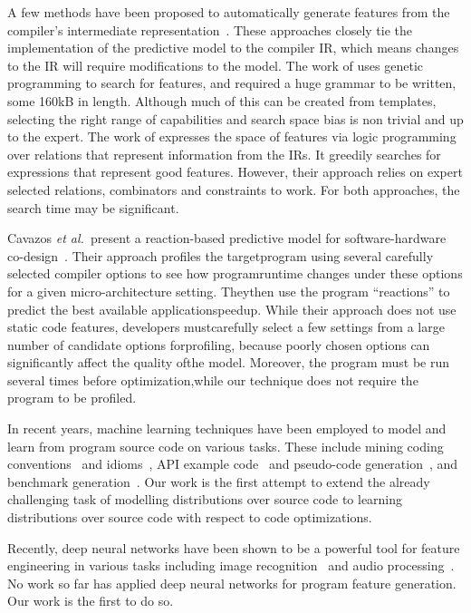 A few methods have been proposed to automatically generate features from the compiler's intermediate representation~\cite{Namolaru2010a,Leather2014}. These approaches closely tie the implementation of the predictive model to the compiler IR, which means changes to the IR will require modifications to the model. The work of \cite{Leather2014} uses genetic programming to search for features, and required a huge grammar to be written, some 160kB in length. Although much of this can be created from templates, selecting the right range of capabilities and search space bias is non trivial and up to the expert. The work of \cite{Namolaru2010a} expresses the space of features via logic programming over relations that represent information from the IRs. It greedily searches for expressions that represent good features. However, their approach relies on expert selected relations, combinators and constraints to work. For both approaches, the search time may be significant.

Cavazos \emph{et al.\ }present a reaction-based predictive model for software-hardware co-design~\cite{Cavazos2006}. Their approach profiles the targetprogram using several carefully selected compiler options to see how programruntime changes under these options for a given micro-architecture setting. Theythen use the program ``reactions'' to predict the best available applicationspeedup. While their approach does not use static code features, developers mustcarefully select a few settings from a large number of candidate options forprofiling, because poorly chosen options can significantly affect the quality ofthe model. Moreover, the program must be run several times before optimization,while our technique does not require the program to be profiled.

In recent years, machine learning techniques have been employed to model and learn from program source code on various tasks. These include mining coding conventions~\cite{Allamanis2014a} and idioms~\cite{Allamanis2014}, API example code~\cite{Zhang2015a} and pseudo-code generation~\cite{Oda2015}, and benchmark generation~\cite{Cummins2017a}. Our work is the first attempt to extend the already challenging task of modelling distributions over source code to learning distributions over source code with respect to code optimizations.

Recently, deep neural networks have been shown to be a powerful tool for feature engineering in various tasks including image recognition~\cite{Krizhevsky2012,He2016} and audio processing~\cite{Lee2009b}. No work so far has applied deep neural networks for program feature generation. Our work is the first to do so.
